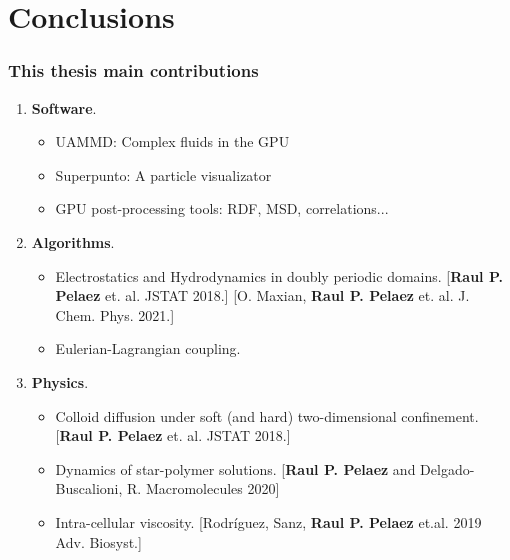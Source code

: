 \documentclass[xcolor=dvipsnames, compress]{beamer}
\begin{document}
\section{Conclusions}
\begin{frame}
  \frametitle{This thesis main contributions}
  \begin{enumerate}
    \Large\color{blue}
  \item \textbf{Software}.
    \begin{itemize}
    \item<+-> UAMMD: Complex fluids in the GPU      
    \item<+-> Superpunto: A particle visualizator
    \item<+-> GPU post-processing tools: RDF, MSD, correlations...
    \end{itemize}
  \item<+-> \textbf{Algorithms}.
    \begin{itemize}
    \item<+-> {Electrostatics and Hydrodynamics in doubly periodic domains.\newline
        {\tiny [{\bf Raul P. Pelaez} et. al. JSTAT 2018.]}\newline
        {\tiny [O. Maxian, {\bf Raul P. Pelaez} et. al. J. Chem. Phys. 2021.]}}
    \item<+-> Eulerian-Lagrangian coupling.
    \end{itemize}
  \item<+-> \textbf{Physics}.
    \begin{itemize}
    \item<+-> {Colloid diffusion under soft (and hard) two-dimensional confinement.\newline
        {\tiny [{\bf Raul P. Pelaez} et. al. JSTAT 2018.]}}
    \item<+-> {Dynamics of star-polymer solutions.\newline
        {\tiny [{\bf Raul P. Pelaez} and Delgado-Buscalioni, R. Macromolecules 2020]}}
    \item<+-> {Intra-cellular viscosity.\newline
        {\tiny [Rodríguez, Sanz, {\bf Raul P. Pelaez} et.al. 2019 Adv. Biosyst.]}}
    \end{itemize}
  \end{enumerate}
\end{frame}
\end{document}
